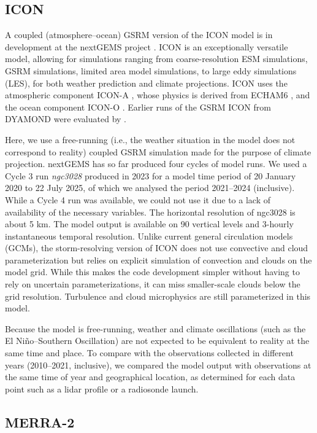 \documentclass[12pt,a4paper]{article}
\begin{document}
\subsection{ICON}

A coupled (atmosphere--ocean) GSRM version of the ICON model is in development
at the nextGEMS project \citep{hohenegger2023}. ICON is an exceptionally
versatile model, allowing for simulations ranging from coarse-resolution ESM
simulations, GSRM simulations, limited area model simulations, to large eddy
simulations (LES), for both weather prediction and climate projections. ICON
uses the atmospheric component ICON-A \citep{giorgetta2018}, whose physics is
derived from ECHAM6 \citep{stevens2013}, and the ocean component ICON-O
\citep{korn2022}. Earlier runs of the GSRM ICON from DYAMOND were evaluated by
\cite{mauritsen2022}.

Here, we use a free-running (i.e., the weather situation in the model does not correspond to reality)
coupled GSRM simulation made for the purpose of climate projection.  nextGEMS
has so far produced four cycles of model runs. We used a Cycle 3 run
\emph{ngc3028} produced in 2023 \citep{nextgems2023a,nextgems2023b} for a model
time period of 20 January 2020 to 22 July 2025, of which we analysed the period 2021--2024 (inclusive). While a Cycle 4 run was available, we could not
use it due to a lack of availability of the necessary variables. The horizontal
resolution of ngc3028 is about 5 km.  The model output is available on 90
vertical levels and 3-hourly instantaneous temporal resolution.  Unlike current
general circulation models (GCMs), the storm-resolving version of ICON does not
use convective and cloud parameterization but relies on explicit simulation of
convection and clouds on the model grid. While this makes the code development
simpler without having to rely on uncertain parameterizations, it can miss
smaller-scale clouds below the grid resolution.  Turbulence and cloud
microphysics are still parameterized in this model.

Because the model is free-running, weather and climate oscillations (such as
the El Niño--Southern Oscillation) are not expected to be equivalent to reality
at the same time and place. To compare with the observations collected in
different years (2010--2021, inclusive), we compared the model output with
observations at the same time of year and geographical location, as determined
for each data point such as a lidar profile or a radiosonde launch.

\subsection{MERRA-2}
\end{document}
